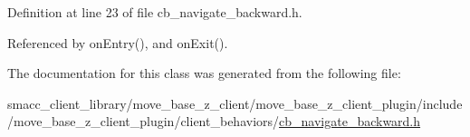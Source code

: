 Definition at line 23 of file cb\+\_\+navigate\+\_\+backward.\+h.



Referenced by on\+Entry(), and on\+Exit().



The documentation for this class was generated from the following file\+:\begin{DoxyCompactItemize}
\item 
smacc\+\_\+client\+\_\+library/move\+\_\+base\+\_\+z\+\_\+client/move\+\_\+base\+\_\+z\+\_\+client\+\_\+plugin/include/move\+\_\+base\+\_\+z\+\_\+client\+\_\+plugin/client\+\_\+behaviors/\hyperlink{smacc__client__library_2move__base__z__client_2move__base__z__client__plugin_2include_2move__basef18dba82c6c9ec751438c97ecb125e5}{cb\+\_\+navigate\+\_\+backward.\+h}\end{DoxyCompactItemize}
